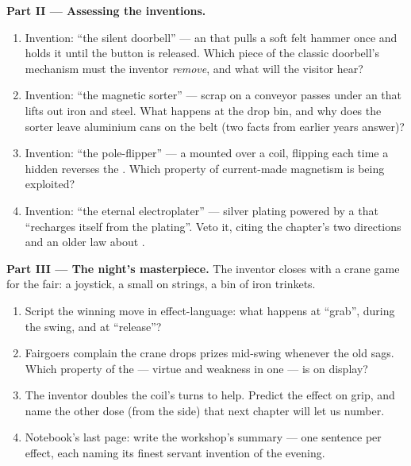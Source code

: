 \begin{problem}
\medskip\noindent\textbf{Part II --- Assessing the inventions.}
\begin{enumerate}[resume]
  \item Invention: ``the silent doorbell'' --- an 
        that pulls a soft felt hammer once and holds it until
        the button is released. Which piece of the classic
        doorbell's mechanism must the inventor \emph{remove},
        and what will the visitor hear?
  \item Invention: ``the magnetic sorter'' --- scrap on a
        conveyor passes under an  that lifts out
        iron and steel. What happens at the drop bin, and why
        does the sorter leave aluminium cans on the belt
        (two  facts from earlier years answer)?
  \item Invention: ``the pole-flipper'' --- a  mounted
        over a coil, flipping each time a hidden 
        reverses the . Which property of
        current-made magnetism is being exploited?
  \item Invention: ``the eternal electroplater'' --- silver
        plating powered by a  that ``recharges itself
        from the plating''. Veto it, citing the chapter's two
         directions and an older law about .
\end{enumerate}

\medskip\noindent\textbf{Part III --- The night's masterpiece.}
The inventor closes with a crane game for the fair: a joystick,
a small  on strings, a bin of iron trinkets.
\begin{enumerate}[resume]
  \item Script the winning move in effect-language: what
        happens at ``grab'', during the swing, and at
        ``release''?
  \item Fairgoers complain the crane drops prizes mid-swing
        whenever the old  sags. Which property of the
         --- virtue and weakness in one --- is on
        display?
  \item The inventor doubles the coil's turns to help. Predict
        the effect on grip, and name the other dose (from the
         side) that next chapter will let us number.
  \item Notebook's last page: write the workshop's summary ---
        one sentence per effect, each naming its finest servant
        invention of the evening.
\end{enumerate}
\end{problem}

